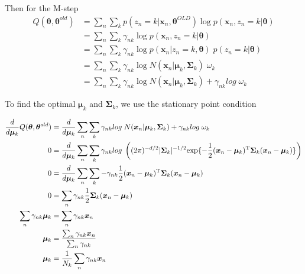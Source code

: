 \documentclass[11pt]{article}
\newcommand{\vct}[1]{\boldsymbol{#1}} %
\newcommand{\mat}[1]{\boldsymbol{#1}} %
\newcommand{\T}{^{\textrm T}} %
\begin{document}
Then for the M-step
\begin{align*}
Q(\mat{\theta},\mat{\theta}^{old}) &= \sum_n \sum_k p(z_n=k|\vct{x}_n, \mat{\theta}^{OLD}) \log  p(\vct{x}_n , z_n = k| \mat{\theta})\\
&= \sum_n \sum_k \gamma_{nk}  \log p(\vct{x}_n, z_n = k | \mat{\theta})\\
&= \sum_n \sum_k \gamma_{nk}  \log p(\vct{x}_n | z_n = k, \mat{\theta}) \; p(z_n = k | \mat{\theta})\\
 &= \sum_n \sum_k \gamma_{nk}   \log N(\vct{x}_n | \vct{\mu}_k, \mat{\Sigma}_k) \; \omega_k \\
 &= \sum_n \sum_k \gamma_{nk}\log  N(\vct{x}_n | \vct{\mu}_k, \mat{\Sigma}_k) + \gamma_{nk} log \;  \omega_k
\end{align*}

To find the optimal $\vct{\mu}_k$ and $\mat{\Sigma}_k$, we use the stationary point condition

\begin{align*}
\frac{d}{d\vct{\mu}_k}Q(\mat{\theta},\mat{\theta}^{old}) &= \frac{d}{d\vct{\mu}_k}\sum_n \sum_k \gamma_{nk}log \; N(\vct{x}_n | \vct{\mu}_k, \mat{\Sigma}_k) + \gamma_{nk} log \;  \omega_k\\
0 &= \frac{d}{d\vct{\mu}_k} \sum_n \sum_k \gamma_{nk}log \; \left((2 \pi)^{-d/2} |\mat{\Sigma}_k|^{-1/2} \text{exp}\{-\frac{1}{2}(\vct{x}_n - \vct{\mu}_k)\T \mat{\Sigma}_k (\vct{x}_n - \vct{\mu}_k)\}\right)\\
0 &= \frac{d}{d\vct{\mu}_k} \sum_n \sum_k -\gamma_{nk}\frac{1}{2}(\vct{x}_n - \vct{\mu}_k)\T \mat{\Sigma}_k (\vct{x}_n - \vct{\mu}_k)\\
0 &=  \sum_n \gamma_{nk}\frac{1}{2} \mat{\Sigma}_k (\vct{x}_n - \vct{\mu}_k)\\
\sum_n \gamma_{nk}  \vct{\mu}_k &=  \sum_n \gamma_{nk}\vct{x}_n\\
\vct{\mu}_k &=  \frac{\sum_n \gamma_{nk}\vct{x}_n}{\sum_n \gamma_{nk}}\\
\vct{\mu}_k &=  \frac{1}{N_k}\sum_n \gamma_{nk}\vct{x}_n\\
\end{align*}
\end{document}
